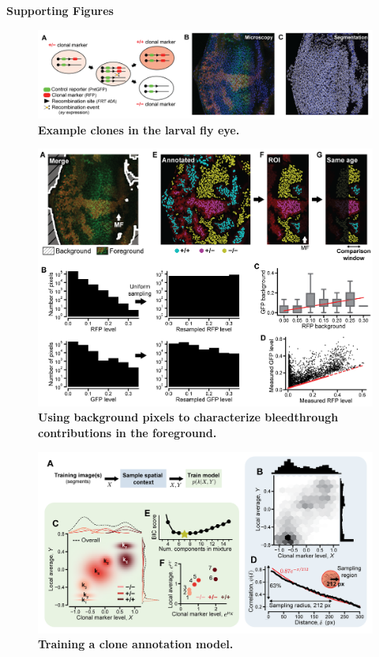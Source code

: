 \documentclass[10pt,letterpaper]{article}
\begin{document}
\vspace*{0.2in}

\begin{center}
{\Huge\textbf{Supporting Figures}}
\end{center}
\vspace*{0.5in}

\begin{figure}[h!]
\centering
\includegraphics[width=1.0\columnwidth]{./figure_S1}
\caption{\textbf{Example clones in the larval fly eye.}}
\end{figure}
\pagebreak

\begin{figure}[h]
\centering
\includegraphics[scale=1.0]{./figure_S2}
\caption{\textbf{Using background pixels to characterize bleedthrough contributions in the foreground.}}
\end{figure}
\pagebreak

\begin{figure}[h]
\centering
\includegraphics[scale=1.0]{./figure_S3}
\caption{\textbf{Training a clone annotation model.}}
\end{figure}
\pagebreak
\end{document}

